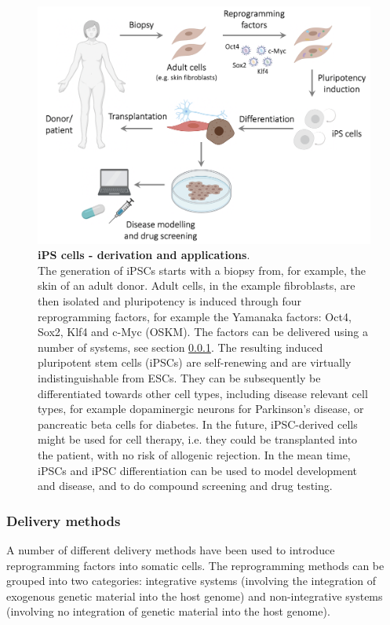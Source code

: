 \begin{figure}[htbp]
\centering
\includegraphics[width=14cm]{Chapter1/Fig/ipscs.png}
\caption[iPS cells]{\textbf{iPS cells - derivation and applications}.\\
The generation of iPSCs starts with a biopsy from, for example, the skin of an adult donor.
Adult cells, in the example fibroblasts, are then isolated and pluripotency is induced through four reprogramming factors, for example the Yamanaka factors: Oct4, Sox2, Klf4 and c-Myc (OSKM).
The factors can be delivered using a number of systems, see section \ref{sec:ipsc_delivery}.
The resulting induced pluripotent stem cells (iPSCs) are self-renewing and are virtually indistinguishable from ESCs.
They can be subsequently be differentiated towards other cell types, including disease relevant cell types, for example dopaminergic neurons for Parkinson's disease, or pancreatic beta cells for diabetes.
In the future, iPSC-derived cells might be used for cell therapy, i.e. they could be transplanted into the patient, with no risk of allogenic rejection.
In the mean time, iPSCs and iPSC differentiation can be used to model development and disease, and to do compound screening and drug testing.}
\label{fig:ipsc}
\end{figure}

\newpage

\subsubsection{Delivery methods}
\label{sec:ipsc_delivery}

A number of different delivery methods have been used to introduce reprogramming factors into somatic cells. 
The reprogramming methods can be grouped into two categories: integrative systems (involving the integration of exogenous genetic material into the host genome) and non-integrative systems (involving no integration of genetic material into the host genome). \\

